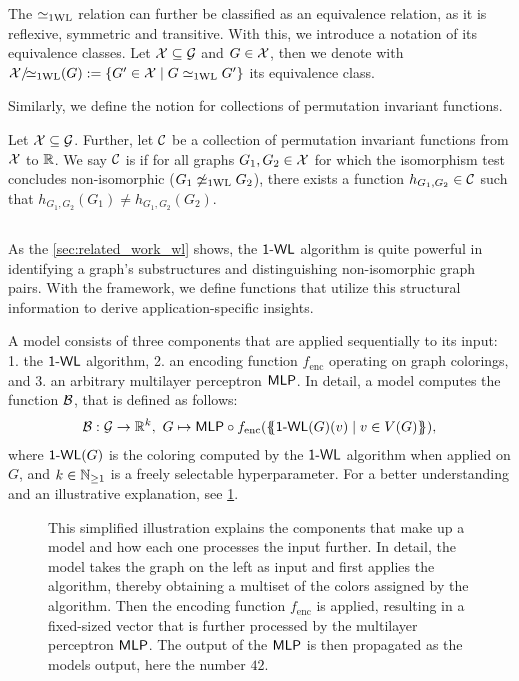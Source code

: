 The $\simeq_{\text{1WL}}$ relation can further be classified as an equivalence relation, as it is reflexive, symmetric and transitive. With this, we introduce a notation of its equivalence classes. Let $\mathcal{X} \subseteq \mathcal{G}$ and $G \in \mathcal{X}$, then we denote with $\mathcal{X}/\!{\simeq_{\text{1WL}}}(G): = \{ G' \in \mathcal{X} \mid G \simeq_{\text{1WL}} G' \}$ its equivalence class.

Similarly, we define the notion \wldisc for collections of permutation invariant functions.

\begin{definition}[\wldisc]
    Let $\mathcal{X} \subseteq \mathcal{G}$. Further, let $\mathcal{C}$ be a collection of permutation invariant functions from $\mathcal{X}$ to $\mathbb{R}$. We say $\mathcal{C}$ is \wldisc if for all graphs $G_1, G_2 \in \mathcal{X}$ for which the \wl isomorphism test concludes non-isomorphic ($G_1 \not\simeq_{\text{1WL}} G_2$), there exists a function $h_{G_1, G_2} \in \mathcal{C}$ such that $h_{G_1, G_2}(G_1) \neq h_{G_1, G_2}(G_2)$.
\end{definition}

\subsection{\wlnn}\label{sec:definition_wlnn}
As the \cref{sec:related_work_wl} shows, the $\textsf{1-WL}$ algorithm is quite powerful in identifying a graph's substructures and distinguishing non-isomorphic graph pairs. With the \wlnn framework, we define functions that utilize this structural information to derive application-specific insights.

\begin{definition}[\wlnn]
    A \wlnn model consists of three components that are applied sequentially to its input: 1. the $\textsf{1-WL}$ algorithm, 2. an encoding function $f_\text{enc}$ operating on graph colorings, and 3. an arbitrary multilayer perceptron $\textsf{MLP}$. In detail, a \wlnn model computes the function $\mathcal{B}$, that is defined as follows:
    \begin{align*}
        \mathcal{B}: \mathcal{G} \rightarrow \mathbb{R}^k, \ G \mapsto \textsf{MLP} \circ f_{\text{enc}}(\{\!\!\{ \textsf{1-WL}(G)(v) \mid v \in V(G) \}\!\!\}),
    \end{align*}
    where $\textsf{1-WL}(G)$ is the coloring computed by the $\textsf{1-WL}$ algorithm when applied on $G$, and $k \in \mathbb{N}_{\geq 1}$ is a freely selectable hyperparameter. For a better understanding and an illustrative explanation, see \cref{fig:wlnn}.
\end{definition}

\begin{figure}[!htb]
    \centering
    
    \caption{This simplified illustration explains the components that make up a \wlnn model and how each one processes the input further. In detail, the model takes the graph on the left as input and first applies the \wl algorithm, thereby obtaining a multiset of the colors assigned by the algorithm. Then the encoding function $f_\text{enc}$ is applied, resulting in a fixed-sized vector that is further processed by the multilayer perceptron $\textsf{MLP}$. The output of the $\textsf{MLP}$ is then propagated as the \wlnn models output, here the number $42$.}
    \label{fig:wlnn}
\end{figure}

